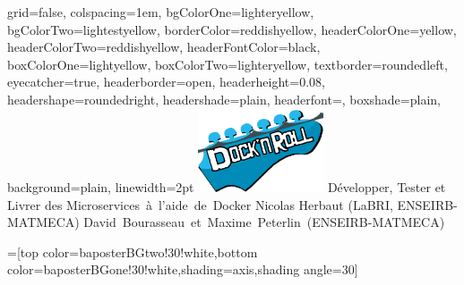 \documentclass[portrait,final,a0paper]{baposter}
\begin{document}
\newlength{\leftimgwidth}
\begin{poster}%
  {
  grid=false,
  colspacing=1em,
  bgColorOne=lighteryellow,
  bgColorTwo=lightestyellow,
  borderColor=reddishyellow,
  headerColorOne=yellow,
  headerColorTwo=reddishyellow,
  headerFontColor=black,
  boxColorOne=lightyellow,
  boxColorTwo=lighteryellow,
  textborder=roundedleft,
  eyecatcher=true,
  headerborder=open,
  headerheight=0.08\textheight,
  headershape=roundedright,
  headershade=plain,
  headerfont=\Large\textsf, %
  boxshade=plain,
  background=plain,
  linewidth=2pt
  }
  {\includegraphics[width=10em]{docknroll}} %
  {\sf %
   Développer, Tester et Livrer des \mbox{Microservices à l'aide de Docker}}
  {\sf %
  \vspace{0.5em}
  Nicolas Herbaut (LaBRI, ENSEIRB-MATMECA) \mbox{David Bourasseau et Maxime Peterlin (ENSEIRB-MATMECA)}
  }
  {%
  }

  =[top color=baposterBGtwo!30!white,bottom color=baposterBGone!30!white,shading=axis,shading angle=30]


\end{poster}
\end{document}
